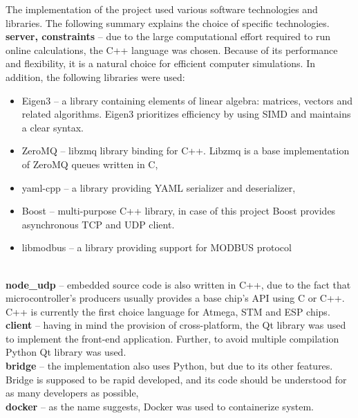 The implementation of the project used various software technologies and libraries. The following summary explains the choice of specific technologies.\\

\noindent\textbf{server, constraints} -- due to the large computational effort required to run online calculations, the C++ language was chosen. Because of its performance and flexibility, it is a natural choice for efficient computer simulations. In addition, the following libraries were used:
\begin{itemize}[noitemsep,nolistsep]
	\item Eigen3 -- a library containing elements of linear algebra: matrices, vectors and related algorithms. Eigen3 prioritizes efficiency by using SIMD and maintains a clear syntax.
	\item ZeroMQ -- libzmq library binding for C++. Libzmq is a base implementation of ZeroMQ queues written in C,
	\item yaml-cpp -- a library providing YAML serializer and deserializer,
	\item Boost -- multi-purpose C++ library, in case of this project Boost provides asynchronous TCP and UDP client. 
	\item libmodbus -- a library providing support for MODBUS protocol
\end{itemize}
\  \\
\textbf{node\_udp} -- embedded source code is also written in C++, due to the fact that microcontroller's producers usually provides a base chip's API using C or C++. C++ is currently the first choice language for Atmega, STM and ESP chips.\\

\noindent\textbf{client} -- having in mind the provision of cross-platform, the Qt library was used to implement the front-end application. Further, to avoid multiple compilation Python Qt library was used. \\

\noindent\textbf{bridge} -- the implementation also uses Python, but due to its other features. Bridge is supposed to be rapid developed, and its code should be understood for as many developers as possible,\\

\noindent\textbf{docker} -- as the name suggests, Docker was used to containerize system.   
	
